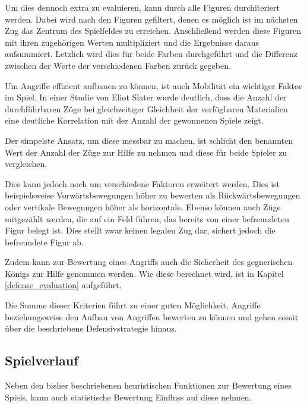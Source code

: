 Um dies dennoch extra zu evaluieren, kann durch alle Figuren durchiteriert werden. Dabei wird nach den Figuren gefiltert, denen es möglich ist im nächsten Zug das Zentrum des Spielfeldes zu erreichen. Anschließend werden diese Figuren mit ihren zugehörigen Werten multipliziert und die Ergebnisse daraus aufsummiert. Letzlich wird dies für beide Farben durchgeführt und die Differenz zwischen der Werte der verschiedenen Farben zurück gegeben. \cite{O.V.2019}


Um Angriffe effizient aufbauen zu können, ist auch Mobilität ein wichtiger Faktor im Spiel. In einer Studie von Eliot Slater wurde deutlich, dass die Anzahl der durchführbaren Züge bei gleichzeitiger Gleichheit der verfügbaren Materialien eine deutliche Korrelation mit der Anzahl der gewonnenen Spiele zeigt. \cite{Slater1988}

Der simpelste Ansatz, um diese messbar zu machen, ist schlicht den benannten Wert der Anzahl der Züge zur Hilfe zu nehmen und diese für beide Spieler zu vergleichen.

Dies kann jedoch noch um verschiedene Faktoren erweitert werden. Dies ist beispielsweise Vorwärtsbewegungen höher zu bewerten als Rückwärtsbewegungen oder vertikale Bewegungen höher als horizontale. Ebenso können auch Züge mitgezählt werden, die auf ein Feld führen, das bereits von einer befreundeten Figur belegt ist. Dies stellt zwar keinen legalen Zug dar, sichert jedoch die befreundete Figur ab. \cite{O.V:2019}


Zudem kann zur Bewertung eines Angriffs auch die Sicherheit des gegnerischen Königs zur Hilfe genommen werden. Wie diese berechnet wird, ist in Kapitel \ref{defense_evaluation} aufgeführt.

Die Summe dieser Kriterien führt zu einer guten Möglichkeit, Angriffe beziehungsweise den Aufbau von Angriffen bewerten zu können und gehen somit über die beschriebene Defensivstrategie hinaus.


\subsection{Spielverlauf}\label{history_evaluation}

Neben den bisher beschriebenen heuristischen Funktionen zur Bewertung eines Spiels, kann auch statistische Bewertung Einfluss auf diese nehmen.

